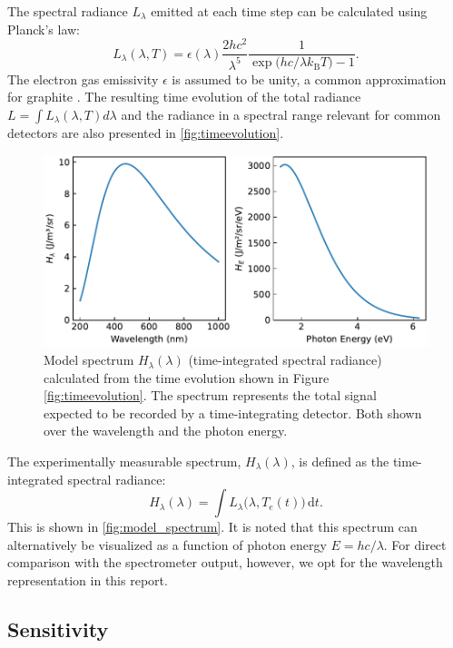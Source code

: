 \documentclass[
	a4paper,
]{scrarticle}
\begin{document}
The spectral radiance $L_\lambda$ emitted at each time step can be calculated using Planck's law:
\begin{equation}
    L_\lambda(\lambda,T)
    = \epsilon(\lambda) \frac{2hc^{2}}{\lambda^{5}}
    \frac{1}{\exp\bigl(hc / \lambda k_{\mathrm B}T\bigr)-1}.
\end{equation}
The electron gas emissivity $\epsilon$ is assumed to be unity, a common approximation for graphite \cite{sapritskyBlackbodyRadiometry1995}. The resulting time evolution of the total radiance $L=\int L_\lambda(\lambda, T) d\lambda$ and the radiance in a spectral range relevant for common detectors are also presented in \autoref{fig:timeevolution}.

\begin{figure}
    \centering
    \includegraphics{../analysis/figures/model.spectrum.pdf}
    \caption{Model spectrum $H_\lambda(\lambda)$ (time-integrated spectral radiance) calculated from the time evolution shown in Figure \ref{fig:timeevolution}. The spectrum represents the total signal expected to be recorded by a time-integrating detector. Both shown over the wavelength and the photon energy.}
    \label{fig:model_spectrum}
\end{figure}

The experimentally measurable spectrum, $H_\lambda(\lambda)$, is defined as the time-integrated spectral radiance:
\begin{equation}
      H_\lambda(\lambda) = 
      \int L_\lambda\bigl(\lambda, T_e(t)\bigr)\,\mathrm dt.
\end{equation}
This is shown in \autoref{fig:model_spectrum}. It is noted that this spectrum can alternatively be visualized as a function of photon energy $E = h c / \lambda$. For direct comparison with the spectrometer output, however, we opt for the wavelength representation in this report.

\subsection{Sensitivity}
\end{document}
